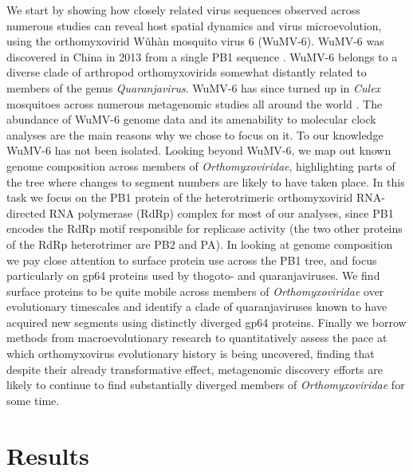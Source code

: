 \documentclass[11pt,twocolumn]{article}
\begin{document}
We start by showing how closely related virus sequences observed across numerous studies can reveal host spatial dynamics and virus microevolution, using the orthomyxovirid W\v{u}h\`{a}n mosquito virus 6 (WuMV-6).
WuMV-6 was discovered in China in 2013 from a single PB1 sequence \citep{li_unprecedented_2015}. 
WuMV-6 belongs to a diverse clade of arthropod orthomyxovirids somewhat distantly related to members of the genus \textit{Quaranjavirus}.
WuMV-6 has since turned up in \textit{Culex} mosquitoes across numerous metagenomic studies all around the world \citep{shi_high-resolution_2017,pettersson_meta-transcriptomic_2019,batson_single_2021}.
The abundance of WuMV-6 genome data and its amenability to molecular clock analyses are the main reasons why we chose to focus on it.
To our knowledge WuMV-6 has not been isolated.
Looking beyond WuMV-6, we map out known genome composition across members of \textit{Orthomyxoviridae}, highlighting parts of the tree where changes to segment numbers are likely to have taken place.
In this task we focus on the PB1 protein of the heterotrimeric orthomyxovirid RNA-directed RNA polymerase (RdRp) complex for most of our analyses, since PB1 encodes the RdRp motif responsible for replicase activity (the two other proteins of the RdRp heterotrimer are PB2 and PA).
In looking at genome composition we pay close attention to surface protein use across the PB1 tree, and focus particularly on gp64 proteins used by thogoto- and quaranjaviruses.
We find surface proteins to be quite mobile across members of \textit{Orthomyxoviridae} over evolutionary timescales and identify a clade of quaranjaviruses known to have acquired new segments using distinctly diverged gp64 proteins.
Finally we borrow methods from macroevolutionary research to quantitatively assess the pace at which orthomyxovirus evolutionary history is being uncovered, finding that despite their already transformative effect, metagenomic discovery efforts are likely to continue to find substantially diverged members of \textit{Orthomyxoviridae} for some time.



\section{Results}
\end{document}
